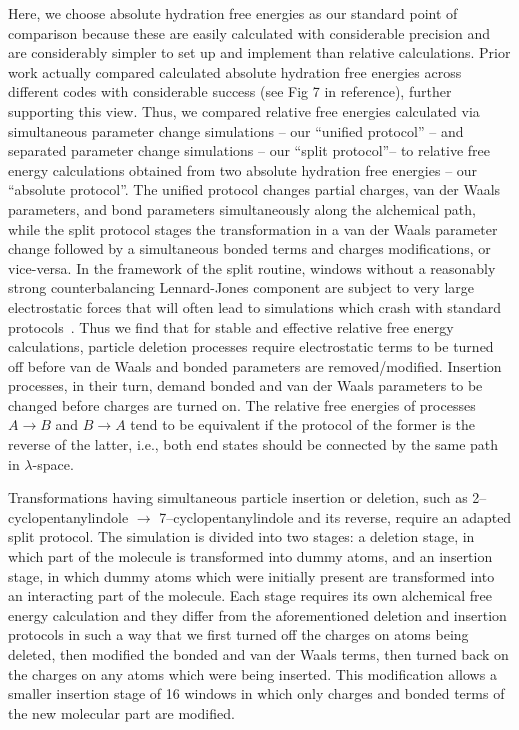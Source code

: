 \documentclass[journal=jctcce,manuscript=article]{achemso}
\begin{document}
Here, we choose absolute hydration free energies as our standard point of comparison 
because these are easily calculated with considerable precision 
\cite{doi:10.1021/acs.jced.7b00104} %
and are considerably simpler to set up and implement than relative calculations.
Prior work actually compared calculated absolute hydration free energies across different codes with considerable success \cite{klimovich_predicting_2010} (see Fig 7 in reference), further supporting this view.
Thus, we compared relative free energies calculated via simultaneous parameter change simulations -- our ``unified protocol'' -- 
and separated parameter change simulations -- our ``split protocol''-- to relative free energy 
calculations obtained from two absolute hydration free energies -- our ``absolute protocol''.
The unified protocol changes partial charges, van der Waals parameters, and bond 
parameters simultaneously along the alchemical path, while the split protocol 
stages the transformation in a van der Waals parameter change followed by a simultaneous  
bonded terms and charges modifications, or vice-versa. In the framework 
of the split routine, windows without a reasonably strong counterbalancing Lennard-Jones 
component are subject to very large electrostatic forces that will often lead to simulations
which crash with standard protocols~\cite{pitera_comparison_2002, 
anwar_robust_2005}. %
Thus we find that for stable and effective relative free energy calculations, particle deletion processes
require electrostatic terms to be turned off before van de Waals and bonded parameters are removed/modified. 
Insertion processes, in their turn, demand bonded and van der Waals parameters to be changed before charges are turned on.
The relative free energies of processes $A \rightarrow B$ and $B \rightarrow A$ tend to be equivalent if the protocol of the former
is the reverse of the latter, i.e., both end states should be connected by the same path in $\lambda$-space. 

Transformations having simultaneous particle insertion or deletion, such as 
2--cyclopentanylindole $\rightarrow$ 7--cyclopentanylindole and its reverse, 
require 
an adapted split protocol. The simulation is divided into two stages: a deletion stage, 
in which part of the molecule is transformed into dummy atoms, and an insertion stage, 
in which dummy atoms which were initially present are transformed into an 
interacting part of the molecule. Each stage requires its own alchemical free energy calculation and
they differ from the aforementioned deletion and insertion protocols in such a way
that we first turned off the charges on atoms being deleted, then modified the bonded 
and van der Waals terms, then turned back on the charges on any atoms which were 
being inserted. This modification allows a smaller insertion stage of 16 windows 
in which only charges and bonded terms of the new molecular part are modified.
\end{document}
